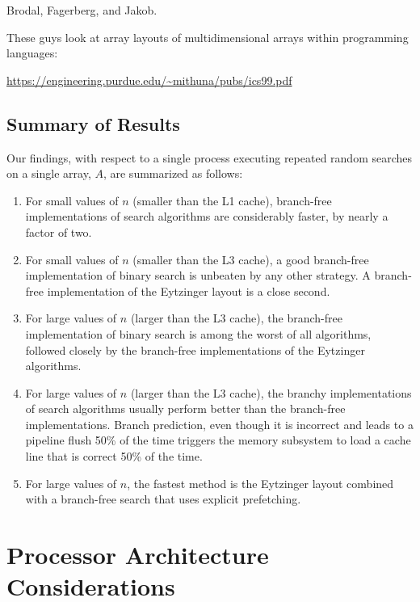 \documentclass{patmorin}
\begin{document}
Brodal, Fagerberg, and Jakob.


These guys look at array layouts of multidimensional arrays within programming languages:

\url{https://engineering.purdue.edu/~mithuna/pubs/ics99.pdf}


\subsection{Summary of Results}

Our findings, with respect to a single process executing repeated random
searches on a single array, $A$, are summarized as follows:

\begin{enumerate}
  \item For small values of $n$ (smaller than the L1 cache), branch-free
    implementations of search algorithms are considerably faster, by nearly
    a factor of two.
  
  \item For small values of $n$ (smaller than the L3 cache), a good
    branch-free implementation of binary search is unbeaten by any other
    strategy.  A branch-free implementation of the Eytzinger layout is a
    close second.
  
  \item For large values of $n$ (larger than the L3 cache), the branch-free
    implementation of binary search is among the worst of all algorithms,
    followed closely by the branch-free implementations of the Eytzinger
    algorithms.
  
  \item For large values of $n$ (larger than the L3 cache), the branchy
    implementations of search algorithms usually perform better than the
    branch-free implementations.  Branch prediction, even though it is
    incorrect and leads to a pipeline flush 50\% of the time triggers
    the memory subsystem to load a cache line that is correct 50\%
    of the time.  

  \item For large values of $n$, the fastest method is the Eytzinger layout
   combined with a branch-free search that uses explicit prefetching.
\end{enumerate}

\section{Processor Architecture Considerations}
\end{document}
